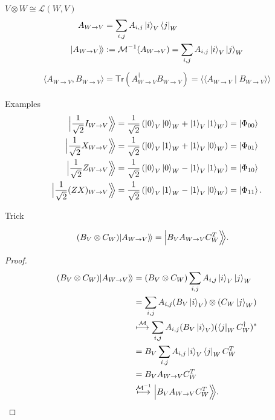 \documentclass[10pt]{beamer}
\newcommand{\Tr}{\mathsf{Tr}}
\newcommand\kett[1]{|#1\rangle\!\rangle}
\newcommand\Kett[1]{\Bigl|#1\Big\rangle\!\!\Big\rangle}
\newcommand\braakett[1]{\langle\!\langle#1\rangle\!\rangle}
\begin{document}
\begin{frame}{$V\otimes W\cong \mathcal{L}(W, V)$}
\begin{align*}
A_{W\to V}&=\sum_{i,j}A_{i,j}\ket{i}_V\bra{j}_W\\
\kett{A_{W\to V}} &:= \mathcal{M}^{-1}(A_{W\to V}) = \sum_{i,j}A_{i,j}\ket{i}_V\ket{j}_W
\end{align*}
\begin{align*}
\langle A_{W\to V}, B_{W\to V}\rangle = \Tr(A_{W\to V}^\dagger B_{W\to V}) = \braakett{A_{W\to V}\mid B_{W\to V}}
\end{align*}

Examples
\small
\begin{align*}
\Kett{\frac1{\sqrt{2}} I_{W\to V}} &= \frac1{\sqrt{2}} \left(\ket{0}_V\ket{0}_W+\ket{1}_V\ket{1}_W\right)=\ket{\Phi_{00}}\\
\Kett{\frac1{\sqrt{2}} X_{W\to V}} &= \frac1{\sqrt{2}} \left(\ket{0}_V\ket{1}_W+\ket{1}_V\ket{0}_W\right)=\ket{\Phi_{01}}\\
\Kett{\frac1{\sqrt{2}} Z_{W\to V}} &= \frac1{\sqrt{2}} \left(\ket{0}_V\ket{0}_W-\ket{1}_V\ket{1}_W\right)=\ket{\Phi_{10}}\\
\Kett{\frac1{\sqrt{2}} (ZX)_{W\to V}} &= \frac1{\sqrt{2}} \left(\ket{0}_V\ket{1}_W-\ket{1}_V\ket{0}_W\right)=\ket{\Phi_{11}}.
\end{align*}
\end{frame}

\begin{frame}{Trick}
\small
\begin{lemma}
\begin{align*}
(B_V\otimes C_W) \kett{A_{W\to V}} &= \Kett{B_VA_{W\to V}C_W^T}.
\end{align*}
\end{lemma}
\begin{proof}
\vspace{-.5em}
\begin{align*}
(B_V\otimes C_W) \kett{A_{W\to V}}
&= (B_V\otimes C_W)\sum_{i,j}A_{i,j}\ket{i}_V\ket{j}_W\\
&= \sum_{i,j}A_{i,j}(B_V \ket{i}_V)\otimes(C_W \ket{j}_W)\\
&\overset{\mathcal{M}}{\longmapsto}
\sum_{i,j}A_{i,j}(B_V \ket{i}_V)(\bra{j}_WC_W^\dagger)^*\\
&=B_V \sum_{i,j}A_{i,j}\ket{i}_V\bra{j}_WC_W^T\\
&=B_V A_{W\to V} C_W^T\\
&\overset{\mathcal{M}^{-1}}{\longmapsto} \Kett{B_VA_{W\to V}C_W^T}.
\end{align*}
\end{proof}
\end{frame}
\end{document}
